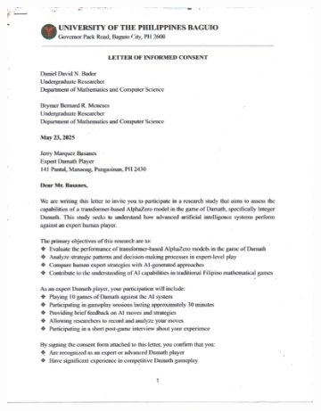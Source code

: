 \begin{appendices}
\begin{figure}[H]
    \centering
    \begin{subfigure}{0.3\textwidth}
        \centering
        \includegraphics[page=1,width=\linewidth]{images/Letter of Informed Consent.pdf}
    \end{subfigure}
    \begin{subfigure}{0.3\textwidth}
        \centering

\end{subfigure}
\end{figure}
\end{appendices}
